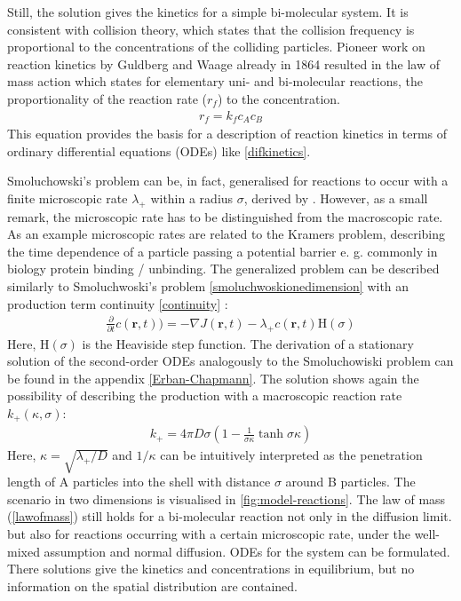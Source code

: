 \documentclass[
  a4paper,BCOR10mm,twoside,
  headsepline,footsepline,%
  fleqn,openbib
]{scrbook}
\begin{document}
Still, the solution gives the kinetics for a simple bi-molecular system. It is consistent with collision theory, which states that the collision frequency is proportional to the concentrations of the colliding particles. Pioneer work on reaction kinetics by Guldberg and Waage already in 1864 \cite{Waage1986} resulted in the law of mass action which states for elementary uni- and bi-molecular reactions, the proportionality of the reaction rate ($r_f$) to the concentration.
\begin{align} \label{lawofmass}
 r_f=k_f c_A c_B
\end{align}
This equation provides the basis for a description of reaction kinetics in terms of ordinary differential equations (ODEs) like \cref{difkinetics}.\par
Smoluchowski's problem can be, in fact, generalised for reactions to occur with a finite microscopic rate $\lambda_{+}$ within a radius $\sigma$, derived by \citet{Erban2009}.  However, as a small remark, the microscopic rate has to be distinguished from the macroscopic rate. As an example microscopic rates are related to the Kramers problem, describing the time dependence of a particle passing a potential barrier e. g. commonly in biology protein binding / unbinding. The generalized problem can be described similarly to Smoluchwoski's problem \cref{smoluchwoskionedimension}  with an production term  continuity  \cref{continuity} :
\begin{align}
\frac{\partial}{\partial t} c(\bm{r},t))=- \nabla J(\bm{r},t)- \lambda_+ c(\bm{r},t) \mathrm{H}(\sigma)
\end{align}
Here, $\mathrm{H}(\sigma)$ is the Heaviside step function. The derivation of a  stationary solution of the second-order ODEs analogously to the Smoluchowiski problem can be found in the appendix \ref{Erban-Chapmann}. The solution shows again the possibility of describing the production with a macroscopic reaction rate $k_{+}(\kappa, \sigma)$:
\begin{align} \label{kalphaerbanchepmann}
k_{+}=4 \pi D \sigma \left( 1-\frac{1}{\sigma \kappa} \tanh{\sigma \kappa}\right)
\end{align}
Here, $\kappa=\sqrt{\lambda_+/D}$ and $1/\kappa$ can be intuitively interpreted as the penetration length of A particles into the shell with distance $\sigma$ around B particles. The scenario in two dimensions is visualised in \cref{fig:model-reactions}. The law of mass (\cref{lawofmass}) still holds for a bi-molecular reaction not only in the diffusion limit. but also for reactions occurring with a certain microscopic rate, under the well-mixed assumption and normal diffusion.  ODEs for the system can be formulated. There solutions give the kinetics and concentrations in equilibrium, but no information on the spatial distribution are contained.
\end{document}
